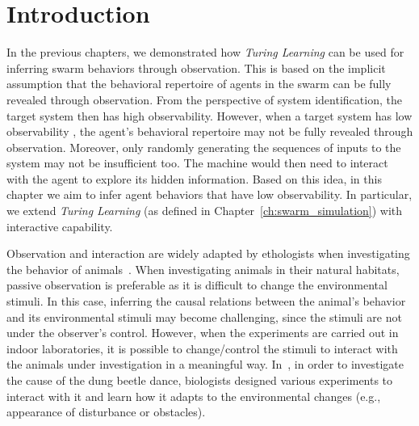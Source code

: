 \section{Introduction}\label{sec:introduction_interaction}

In the previous chapters, we demonstrated how \textit{Turing Learning} can be used for inferring swarm behaviors through observation. This is based on the implicit assumption that the behavioral repertoire of agents in the swarm can be fully revealed through observation. From the perspective of system identification, the target system then has high observability. However, when a target system has low observability \cite{bongard2005active}, the agent's behavioral repertoire may not be fully revealed through observation. Moreover, only randomly generating the sequences of inputs to the system may not be insufficient too. The machine would then need to interact with the agent to explore its hidden information. Based on this idea, in this chapter we aim to infer agent behaviors that have low observability. In particular, we extend \textit{Turing Learning} (as defined in Chapter~\ref{ch:swarm_simulation}) with interactive capability. 

Observation and interaction are widely adapted by ethologists when investigating the behavior of animals~\cite{Martin_1983, Dacke2004, Emily2012}. When investigating animals in their natural habitats, passive observation is preferable as it is difficult to change the environmental stimuli. In this case, inferring the causal relations between the animal's behavior and its environmental stimuli may become challenging, since the stimuli are not under the observer's control. However, when the experiments are carried out in indoor laboratories, it is possible to change/control the stimuli to interact with the animals under investigation in a meaningful way. In~\cite{Emily2012}, in order to investigate the cause of the dung beetle dance, biologists designed various experiments to interact with it and learn how it adapts to the environmental changes (e.g., appearance of disturbance or obstacles).

